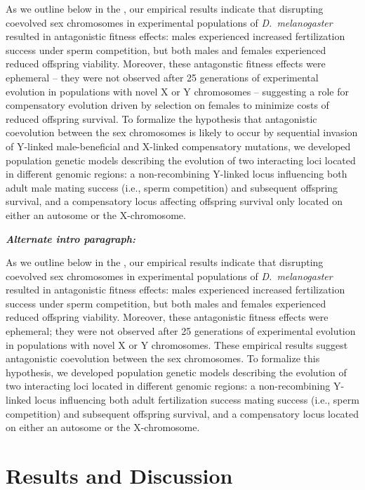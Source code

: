 \documentclass{article}
\begin{document}
As we outline below in the , our empirical results indicate that disrupting coevolved sex chromosomes in experimental populations of {\itshape D.~melanogaster} resulted in antagonistic fitness effects: males experienced increased fertilization success under sperm competition, but both males and females experienced reduced offspring viability. Moreover, these antagonstic fitness effects were ephemeral -- they were not observed after 25 generations of experimental evolution in populations with novel X or Y chromosomes -- suggesting a role for compensatory evolution  driven by selection on females to minimize costs of reduced offspring survival. To formalize the hypothesis that antagonistic coevolution between the sex chromosomes is likely to occur by sequential invasion of Y-linked male-beneficial and X-linked compensatory mutations, we developed population genetic models describing the evolution of two interacting loci located in different genomic regions: a non-recombining Y-linked locus influencing both adult male mating success (i.e., sperm competition) and subsequent offspring survival, and a compensatory locus affecting offspring survival only located on either an autosome or the X-chromosome. 

\bigskip
{\bf \itshape Alternate intro paragraph:}

As we outline below in the , our empirical results indicate that disrupting coevolved sex chromosomes in experimental populations of {\itshape D.~melanogaster} resulted in antagonistic fitness effects: males experienced increased fertilization success under sperm competition, but both males and females experienced reduced offspring viability. Moreover, these antagonistic fitness effects were ephemeral; they were not observed after 25 generations of experimental evolution in populations with novel X or Y chromosomes. These empirical results suggest antagonistic coevolution between the sex chromosomes. To formalize this hypothesis, we developed population genetic models describing the evolution of two interacting loci located in different genomic regions: a non-recombining Y-linked locus influencing both adult fertilization success mating success (i.e., sperm competition) and subsequent offspring survival, and a compensatory locus located on either an autosome or the X-chromosome.

\section{Results and Discussion} \label{sec:ResultsDiscussion}
\end{document}
